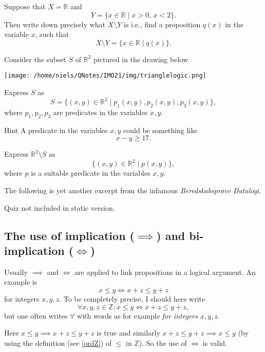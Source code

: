 \begin{exercise}
  Suppose that $X = \mathbb{R}$ and
  $$
    Y = \{x\in \mathbb{R} \mid x > 0,\, x < 2\}.
  $$
  Then write down precisely what $X\setminus Y$ is i.e., find a proposition $q(x)$
  in the variable $x$, such that
  $$
    X\setminus Y = \{x\in \mathbb{R} \mid q(x)\}.
  $$
\end{exercise}

\begin{exercise}
  Consider the subset $S$ of $\mathbb{R}^2$ pictured in the drawing below

  \begin{center}\texttt{[image: /home/niels/QNotes/IMO21/img/trianglelogic.png]}\end{center}

  Express $S$ as
  $$
    S = \{(x, y)\in \mathbb{R}^2 \mid p_1(x, y), p_2(x, y), p_3(x, y)\},
  $$
  where $p_1, p_2, p_3$ are predicates in the variables $x, y$.

  \begin{button}{Hint}
    A predicate in the variables $x, y$ could be something like
    $$
      x -y \geq 17.
    $$
  \end{button}

  Express $\mathbb{R}^2\setminus S$ as
  $$
    \{(x, y)\in \mathbb{R}^2 \mid p(x, y)\},
  $$
  where $p$ is a suitable predicate in the variables $x, y$.
\end{exercise}

The following is yet another excerpt from the infamous \emph{Beredskabsprøve Datalogi}.

\begin{quizexercise} Quiz not included in static version.\end{quizexercise}

\subsection{The use of implication ($\implies$) and bi-implication ($\iff$)}

Usually $\implies$ and $\iff$ are applied to link propositions in a logical argument. An example
is
$$
  x \leq y \iff x + z \leq y + z
$$
for integers $x, y, z$. To be completely precise, I should here write
$$
  \forall x, y, z\in \mathbb{Z}: x \leq y \iff x + z \leq y + z,
$$
but one often writes $\forall$ with words as for example \emph{for integers $x, y, z$}.

Here $x \leq y\implies x + z \leq y + z$ is true and similarly
$x + z \leq y + z \implies x \leq y$ (by using the definition (see \eqref{ordZ}) of $\leq$ in $\mathbb{Z}$). So the
use of $\iff$ is valid.

